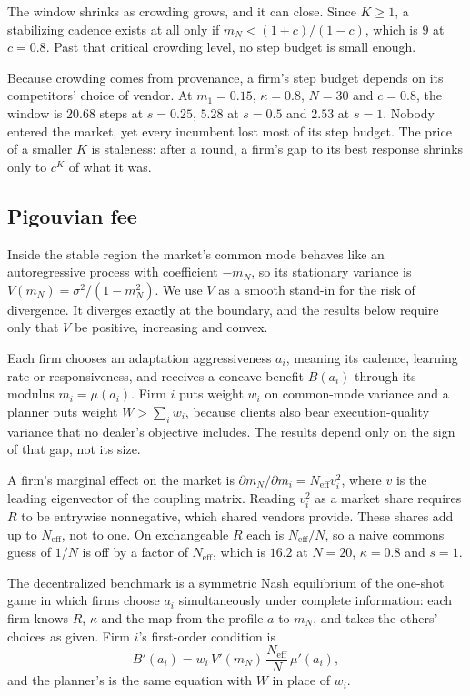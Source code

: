 \documentclass[conference]{IEEEtran}
\theoremstyle{definition}
\newcommand{\Neff}{N_{\mathrm{eff}}}
\begin{document}
The window shrinks as crowding grows, and it can close. Since $K \ge 1$, a
stabilizing cadence exists at all only if $m_N < (1+c)/(1-c)$, which is $9$ at
$c = 0.8$. Past that critical crowding level, no step budget is small enough.

Because crowding comes from provenance, a firm's step budget depends on its
competitors' choice of vendor. At $m_1 = 0.15$, $\kappa = 0.8$, $N = 30$ and
$c = 0.8$, the window is $20.68$ steps at $s = 0.25$, $5.28$ at $s = 0.5$ and
$2.53$ at $s = 1$. Nobody entered the market, yet every incumbent lost most of
its step budget. The price of a smaller $K$ is staleness: after a round, a
firm's gap to its best response shrinks only to $c^{K}$ of what it was.

\subsection{Pigouvian fee}\label{sec:fee}
Inside the stable region the market's common mode behaves like an
autoregressive process with coefficient $-m_N$, so its stationary variance is
$V(m_N) = \sigma^2/(1 - m_N^2)$. We use $V$ as a smooth stand-in for the risk
of divergence. It diverges exactly at the boundary, and the results below
require only that $V$ be positive, increasing and convex.

Each firm chooses an adaptation aggressiveness $a_i$, meaning its cadence,
learning rate or responsiveness, and receives a concave benefit $B(a_i)$
through its modulus $m_i = \mu(a_i)$. Firm $i$ puts weight $w_i$ on
common-mode variance and a planner puts weight $W > \sum_i w_i$, because
clients also bear execution-quality variance that no dealer's objective
includes. The results depend only on the sign of that gap, not its size.

A firm's marginal effect on the market is
$\partial m_N/\partial m_i = \Neff v_i^2$, where $v$ is the leading
eigenvector of the coupling matrix. Reading $v_i^2$ as a market share requires
$R$ to be entrywise nonnegative, which shared vendors provide. These shares
add up to $\Neff$, not to one. On exchangeable $R$ each is $\Neff/N$, so a
naive commons guess of $1/N$ is off by a factor of $\Neff$, which is $16.2$ at
$N = 20$, $\kappa = 0.8$ and $s = 1$.

The decentralized benchmark is a symmetric Nash equilibrium of the one-shot
game in which firms choose $a_i$ simultaneously under complete information:
each firm knows $R$, $\kappa$ and the map from the profile $a$ to $m_N$, and
takes the others' choices as given. Firm $i$'s first-order condition is
\begin{equation}
  B'(a_i) = w_i\,V'(m_N)\,\frac{\Neff}{N}\,\mu'(a_i),
  \label{eq:foc}
\end{equation}
and the planner's is the same equation with $W$ in place of $w_i$.
\end{document}
